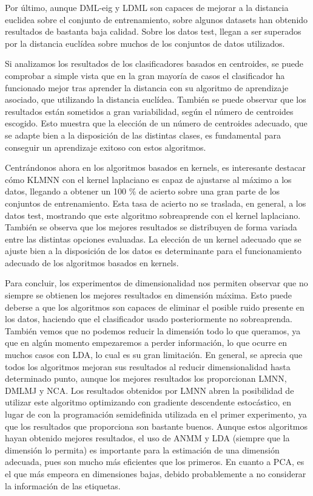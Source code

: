 Por último, aunque DML-eig y LDML son capaces de mejorar a la distancia euclidea sobre el conjunto de entrenamiento, sobre algunos datasets han obtenido resultados de bastanta baja calidad. Sobre los datos test, llegan a ser superados por la distancia euclídea sobre muchos de los conjuntos de datos utilizados.

Si analizamos los resultados de los clasificadores basados en centroides, se puede comprobar a simple vista que en la gran mayoría de casos el clasificador ha funcionado mejor tras aprender la distancia con su algoritmo de aprendizaje asociado, que utilizando la distancia euclídea. También se puede observar que los resultados están sometidos a gran variabilidad, según el número de centroides escogido. Esto muestra que la elección de un número de centroides adecuado, que se adapte bien a la disposición de las distintas clases, es fundamental para conseguir un aprendizaje exitoso con estos algoritmos.

Centrándonos ahora en los algoritmos basados en kernels, es interesante destacar cómo KLMNN con el kernel laplaciano es capaz de ajustarse al máximo a los datos, llegando a obtener un 100 \% de acierto sobre una gran parte de los conjuntos de entrenamiento. Esta tasa de acierto no se traslada, en general, a los datos test, mostrando que este algoritmo sobreaprende con el kernel laplaciano. También se observa que los mejores resultados se distribuyen de forma variada entre las distintas opciones evaluadas. La elección de un kernel adecuado que se ajuste bien a la disposición de los datos es determinante para el funcionamiento adecuado de los algoritmos basados en kernels.

Para concluir, los experimentos de dimensionalidad nos permiten observar que no siempre se obtienen los mejores resultados en dimensión máxima. Esto puede deberse a que los algoritmos son capaces de eliminar el posible ruido presente en los datos, haciendo que el clasificador usado posteriormente no sobreaprenda. También vemos que no podemos reducir la dimensión todo lo que queramos, ya que en algún momento empezaremos a perder información, lo que ocurre en muchos casos con LDA, lo cual es su gran limitación. En general, se aprecia que todos los algoritmos mejoran sus resultados al reducir dimensionalidad hasta determinado punto, aunque los mejores resultados los proporcionan LMNN, DMLMJ y NCA. Los resultados obtenidos por LMNN abren la posibilidad de utilizar este algoritmo optimizando con gradiente descendente estocástico, en lugar de con la programación semidefinida utilizada en el primer experimento, ya que los resultados que proporciona son bastante buenos. Aunque estos algoritmos hayan obtenido mejores resultados, el uso de ANMM y LDA (siempre que la dimensión lo permita) es importante para la estimación de una dimensión adecuada, pues son mucho más eficientes que los primeros. En cuanto a PCA, es el que más empeora en dimensiones bajas, debido probablemente a no considerar la información de las etiquetas.

